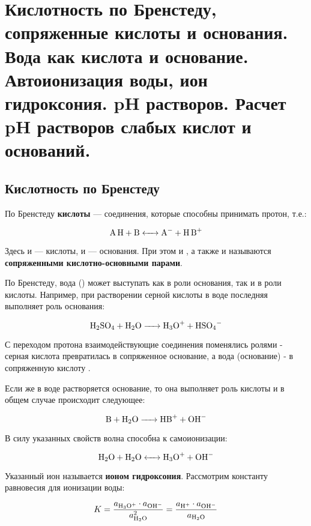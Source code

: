 \section{Кислотность по Бренстеду, сопряженные кислоты и основания. Вода как кислота и основание. Автоионизация воды, ион гидроксония. pH растворов. Расчет pH растворов слабых кислот и оснований.}

\subsection{Кислотность по Бренстеду}

По Бренстеду \textbf{кислоты} --- соединения, которые способны принимать протон, т.е.:

\begin{equation}
	\ce{A H + B <-> A- + H B+}
\end{equation}

Здесь  и  --- кислоты,  и  --- основания. При этом  и , а также  и  называются \textbf{сопряженными кислотно-основными парами}.


По Бренстеду, вода () может выступать как в роли основания, так и в роли кислоты. Например, при растворении серной кислоты в воде последняя выполняет роль основания:

\begin{equation}
	\ce{H2SO4 + H2O -> H3O+ + HSO4-}
\end{equation}

С переходом протона взаимодействующие соединения поменялись ролями - серная кислота превратилась в сопряженное основание, а вода (основание) - в сопряженную кислоту .

Если же в воде растворяется основание, то она выполняет роль кислоты и в общем случае происходит следующее:

\begin{equation}
	\ce{B + H2O -> HB+ + OH-}
\end{equation}

В силу указанных свойств волна способна к самоионизации:

\begin{equation}
	\ce{H2O + H2O <-> H3O+ + OH-}
\end{equation}

Указанный ион  называется \textbf{ионом гидроксония}. Рассмотрим константу равновесия для ионизации воды:

\begin{equation}
	K = \frac{a_{\ce{H3O+}} \cdot a_{\ce{OH^-}}}{a^2_{\ce{H2O}}} = \frac{a_{\ce{H+}} \cdot a_{\ce{OH-}}}{a_{\ce{H2O}}}
\end{equation}

